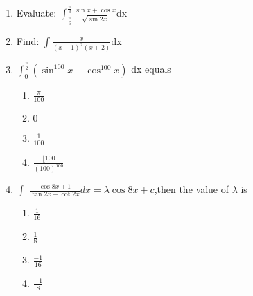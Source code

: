 \documentclass[12pt]{article}
\begin{document}
\begin{enumerate}
\item Evaluate:
$\int_{\frac{\pi}{6}}^{\frac{\pi}{3}}  {\frac{\sin x + \cos x}{\sqrt{\sin 2x}}} $dx  

\item Find:
$\int {\frac{x}{(x-1)^2(x+2)}} $dx
      
\item  $\int_{0}^{\frac{\pi}{2}} (\sin^{100} x-\cos^{100} x)$ dx equals
\begin{enumerate}
\item  ${\frac{\pi}{100}}$
\item $0$
\item ${\frac{1}{100}}$
\item  ${\frac{\lfloor 100} {(100)^{100}}}$ 
\end{enumerate}

\item $\int$ ${\frac{\cos 8x+1}{\tan 2x- \cot 2x}} dx= \lambda \cos 8x+c $,then the value of $\lambda$  is
\begin{enumerate}
\item  ${\frac{1}{16}}$
\item  ${\frac{1}{8}}$
\item  ${\frac{-1}{16}}$
\item  ${\frac{-1}{8}}$
\end{enumerate}

\end{enumerate}
\end{document}
